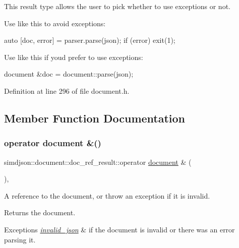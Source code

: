 This result type allows the user to pick whether to use exceptions or not.

Use like this to avoid exceptions\+: \begin{DoxyVerb}auto [doc, error] = parser.parse(json);
if (error) { exit(1); }
\end{DoxyVerb}


Use like this if you\textquotesingle{}d prefer to use exceptions\+: \begin{DoxyVerb}document &doc = document::parse(json);\end{DoxyVerb}
 

Definition at line 296 of file document.\+h.



\subsection{Member Function Documentation}
\mbox{\label{classsimdjson_1_1document_1_1doc__ref__result_a6b32b150a42315944f4c73097f0eb700}} 
\subsubsection{\texorpdfstring{operator document \&()}{operator document \&()}}
{\footnotesize\ttfamily simdjson\+::document\+::doc\+\_\+ref\+\_\+result\+::operator \hyperlink{classsimdjson_1_1document}{document} \& (\begin{DoxyParamCaption}{ }\end{DoxyParamCaption})\hspace{0.3cm}{\ttfamily [inline]}, {\ttfamily [noexcept]}}



A reference to the document, or throw an exception if it is invalid. 

\begin{DoxyReturn}{Returns}
the document. 
\end{DoxyReturn}

\begin{DoxyExceptions}{Exceptions}
{\em \hyperlink{structsimdjson_1_1invalid__json}{invalid\+\_\+json}} & if the document is invalid or there was an error parsing it. \\
\hline
\end{DoxyExceptions}


